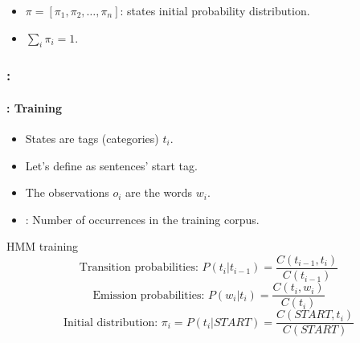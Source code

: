 \documentclass[xcolor=table]{beamer}
\begin{document}
\begin{frame}
\begin{minipage}{.45\textwidth}
		\end{minipage}
	
	\begin{itemize}
			\item $\pi = [\pi_1, \pi_2, \ldots, \pi_n ]$: states initial probability distribution.
			\item $\sum_i \pi_i = 1$.
		\end{itemize}
	
\end{frame}

\begin{frame}
	\frametitle{\insertshortsubtitle: \insertsection}
	\framesubtitle{\insertsubsection: Training}
	
	\begin{itemize}
			\item States are tags (categories) $t_i$.
			\item Let's define  as sentences' start tag.
			\item The observations $o_i$ are the words $w_i$.
			\item {}: Number of occurrences in the training corpus.
		\end{itemize}
	
	\begin{block}{HMM training}
			\[
			\text{Transition probabilities: } P(t_i | t_{i-1}) = \frac{C(t_{i-1}, t_i)}{C(t_{i-1})} 
			\]\[
			\text{Emission probabilities: } P(w_i | t_i) = \frac{C(t_i, w_i)}{C(t_i)}
			\]\[
			\text{Initial distribution: } \pi_i = P(t_i | START) = \frac{C(START, t_i)}{C(START)}
			\]
		\end{block}
\end{frame}
\end{document}
